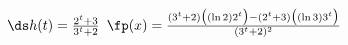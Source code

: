 {$\ds h(t) = \frac{2^t+3}{3^t+2}$
}
{$\fp(x) = \frac{(3^t+2)\big((\ln 2) 2^t\big)-(2^t+3)\big((\ln 3)3^t\big)}{(3^t+2)^2}$
}

